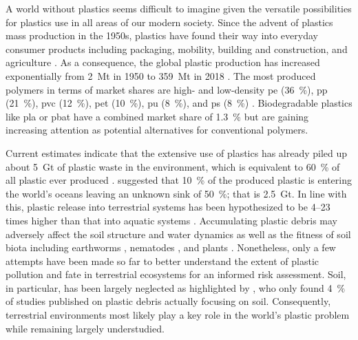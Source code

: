 A world without plastics seems difficult to imagine given the versatile possibilities for plastics use in all areas of our modern society. Since the advent of plastics mass production in the 1950s, plastics have found their way into everyday consumer products including packaging, mobility, building and construction, and agriculture \citep{GeyerProduction2017,KaweckiPolymerSpecific2019}. As a consequence, the global plastic production has increased exponentially from \SI{2}{\mega\tonne} in 1950 to \SI{359}{\mega\tonne} in 2018 \citep{PlasticsEuropePlastics2019,GeyerProduction2017}. The most produced polymers in terms of market shares are high- and low-density \ac{pe} (\SI{36}{\percent}), \ac{pp} (\SI{21}{\percent}), \ac{pvc} (\SI{12}{\percent}), \ac{pet} (\SI{10}{\percent}), \ac{pu} (\SI{8}{\percent}), and \ac{ps} (\SI{8}{\percent}) \citep{GeyerProduction2017}. Biodegradable plastics like \ac{pla} or \ac{pbat} have a combined market share of \SI{1.3}{\percent} \citep{BurgstallerStudy2018} but are gaining increasing attention as potential alternatives for conventional polymers.

Current estimates indicate that the extensive use of plastics has already piled up about \SI{5}{\giga\tonne} of plastic waste in the environment, which is equivalent to \SI{60}{\percent} of all plastic ever produced \citep{GeyerProduction2017}. \citet{ThompsonPlastic2006} suggested that \SI{10}{\percent} of the produced plastic is entering the world's oceans leaving an unknown sink of \SI{50}{\percent}; that is \SI{2.5}{\giga\tonne}.
In line with this, plastic release into terrestrial systems has been hypothesized to be \numrange{4}{23} times higher than that into aquatic systems \citep{HortonLarge2017}. Accumulating plastic debris may adversely affect the soil structure and water dynamics \citep{deSouzaMachadoMicroplastics2019,deSouzaMachadoMicroplastics2020} as well as the fitness of soil biota including earthworms \citep{BootsEffects2019}, nematodes \citep{LeiPolystyrene2018}, and plants \citep{RilligMicroplastic2019,BuksWhat2020}. Nonetheless, only a few attempts have been made so far to better understand the extent of plastic pollution and fate in terrestrial ecosystems for an informed risk assessment. Soil, in particular, has been largely neglected as highlighted by \citet{HeMicroplastics2018}, who only found \SI{4}{\percent} of studies published on plastic debris actually focusing on soil. Consequently, terrestrial environments most likely play a key role in the world's plastic problem while remaining largely understudied.

